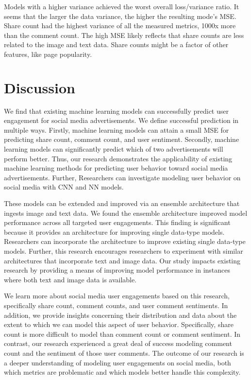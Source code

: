 \documentclass[mksc,blindrev]{informs3} %
\begin{document}
Models with a higher variance achieved the worst overall loss/variance ratio.  It seems that the larger the data variance, the higher the resulting mode's MSE.  Share count had the highest variance of all the measured metrics, 1000x more than the comment count.  The high MSE likely reflects that share counts are less related to the image and text data. Share counts might be a factor of other features, like page popularity.

\section{Discussion}


We find that existing machine learning models can successfully predict user engagement for social media advertisements. We define successful prediction in multiple ways. Firstly, machine learning models can attain a small MSE for predicting share count, comment count, and user sentiment. Secondly, machine learning models can significantly predict which of two advertisements will perform better. Thus, our research demonstrates the applicability of existing machine learning methods for predicting user behavior toward social media advertisements. Further, Researchers can investigate modeling user behavior on social media with CNN and NN models.

These models can be extended and improved via an ensemble architecture that ingests image and text data. We found the ensemble architecture improved model performance across all targeted user engagements. This finding is significant because it provides an architecture for improving single data-type models. Researchers can incorporate the architecture to improve existing single data-type models. Further, this research encourages researchers to experiment with similar architectures that incorporate text and image data. Our study impacts existing research by providing a means of improving model performance in instances where both text and image data is available.

We learn more about social media user engagements based on this research, specifically share count, comment counts, and user comment sentiments. In addition, we provide insights concerning their distribution and data about the extent to which we can model this aspect of user behavior. Specifically, share count is more difficult to model than comment count or comment sentiment. In contrast, our research experienced a great deal of success modeling comment count and the sentiment of those user comments. The outcome of our research is a deeper understanding of modeling user engagements on social media, both which metrics are problematic and which models better handle this complexity.
\end{document}
